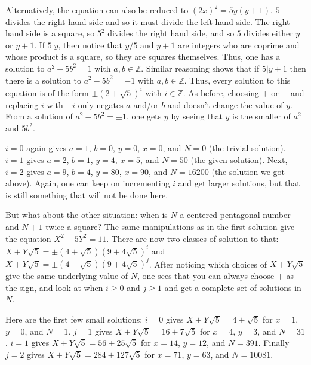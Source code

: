 \documentclass[11pt]{article}
\theoremstyle{definition}
\newcommand{\Z}{\mathbb{Z}}
\begin{document}
Alternatively, the equation can also be reduced to $(2x)^2 = 5y(y+1)$.  $5$ divides the right hand side and so it must divide the left hand side.  The right hand side is a square, so $5^2$ divides the right hand side, and so $5$ divides either $y$ or $y+1$.  If $5|y$, then notice that $y/5$ and $y+1$ are integers who are coprime and whose product is a square, so they are squares themselves.  Thus, one has a solution to $a^2-5b^2 = 1$ with $a, b \in \Z$.  Similar reasoning shows that if $5|y+1$ then there is a solution to $a^2-5b^2 = -1$ with $a, b \in \Z$.  Thus, every solution to this equation is of the form $\pm(2+\sqrt{5})^i$ with $i \in \Z$.  As before, choosing $+$ or $-$ and replacing $i$ with $-i$ only negates $a$ and/or $b$ and doesn't change the value of $y$.  From a solution of $a^2 - 5b^2 = \pm1$, one gets $y$ by seeing that $y$ is the smaller of $a^2$ and $5b^2$.

$i = 0$ again gives $a = 1$, $b = 0$, $y = 0$, $x = 0$, and $N =0$ (the trivial solution).  $i = 1$ gives $a = 2$, $b = 1$, $y = 4$, $x = 5$, and $N = 50$ (the given solution).  Next, $i = 2$ gives $a = 9$, $b = 4$, $y = 80$, $x = 90$, and $N = 16200$ (the solution we got above).  Again, one can keep on incrementing $i$ and get larger solutions, but that is still something that will not be done here.

But what about the other situation: when is $N$ a centered pentagonal number and $N+1$ twice a square?  The same manipulations as in the first solution give the equation $X^2-5Y^2 = 11$.  There are now two classes of solution to that: $X+Y\sqrt{5} = \pm (4+\sqrt{5}) (9+4\sqrt{5})^{i}$ and $X+Y\sqrt{5} = \pm (4-\sqrt{5}) (9+4\sqrt{5})^{j}$.  After noticing which choices of $X+Y\sqrt{5}$ give the same underlying value of $N$, one sees that you can always choose $+$ as the sign, and look at when $i \geq 0$ and $j \geq 1$ and get a complete set of solutions in $N$.

Here are the first few small solutions: $i = 0$ gives $X+Y\sqrt{5} = 4+\sqrt{5}$ for $x = 1$, $y = 0$, and $N = 1$.  $j = 1$ gives $X + Y \sqrt{5} = 16 + 7\sqrt{5}$ for $x = 4$, $y = 3$, and $N = 31$.  $i = 1$ gives $X+Y\sqrt{5} = 56 + 25\sqrt{5}$ for $x = 14$, $y = 12$, and $N = 391$.  Finally $j = 2$ gives $X+Y\sqrt{5} = 284 + 127\sqrt{5}$ for $x = 71$, $y = 63$, and $N = 10081$.
\end{document}
